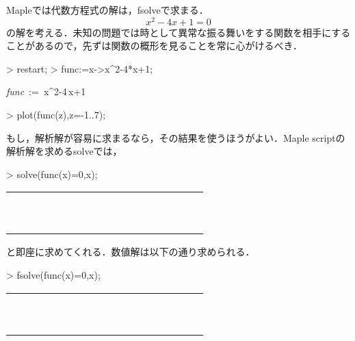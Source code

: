 Mapleでは代数方程式の解は，fsolveで求まる．
\begin{equation*}
x^2-4x+1 = 0
\end{equation*}
の解を考える．未知の問題では時として異常な振る舞いをする関数を相手にすることがあるので，先ずは関数の概形を見ることを常に心がけるべき．
\begin{MapleInput}
> restart;
> func:=x->x^2-4*x+1;
\end{MapleInput}
\begin{MapleOutput}
{\it func}\, := \,x^{2}-4\,x+1
\end{MapleOutput}
\begin{MapleInput}
> plot(func(z),z=-1..7);
\end{MapleInput}

もし，解析解が容易に求まるなら，その結果を使うほうがよい．Maple scriptの解析解を求めるsolveでは，

\begin{MapleInput}
> solve(func(x)=0,x);
\end{MapleInput}

\begin{table}[h]
\begin{center}
\begin{tabular}{|c|c|}
\hline
　　　　　　　　 & 　　　　　　　　 \\ 
　　　　　　　　 & 　　　　　　　　 \\ 
\hline
\end{tabular}
\end{center}
\label{default}
\end{table}%

と即座に求めてくれる．数値解は以下の通り求められる．
\begin{MapleInput}
> fsolve(func(x)=0,x);
\end{MapleInput}
\begin{table}[h]
\begin{center}
\begin{tabular}{|c|c|}
\hline
　　　　　　　　 & 　　　　　　　　 \\ 
　　　　　　　　 & 　　　　　　　　 \\ 
\hline
\end{tabular}
\end{center}
\label{default}
\end{table}%


